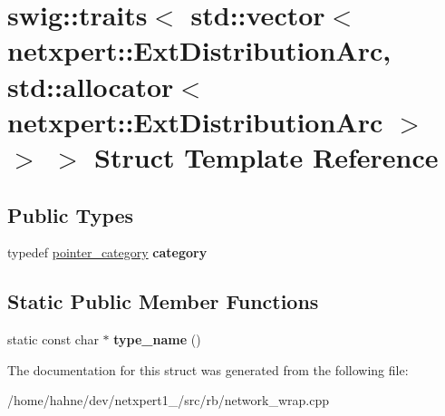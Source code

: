 \hypertarget{structswig_1_1traits_3_01std_1_1vector_3_01netxpert_1_1ExtDistributionArc_00_01std_1_1allocator_82a5b89f4c8a57263dc469d06e4cfb4f}{}\section{swig\+:\+:traits$<$ std\+:\+:vector$<$ netxpert\+:\+:Ext\+Distribution\+Arc, std\+:\+:allocator$<$ netxpert\+:\+:Ext\+Distribution\+Arc $>$ $>$ $>$ Struct Template Reference}
\label{structswig_1_1traits_3_01std_1_1vector_3_01netxpert_1_1ExtDistributionArc_00_01std_1_1allocator_82a5b89f4c8a57263dc469d06e4cfb4f}
\subsection*{Public Types}
\begin{DoxyCompactItemize}
\item 
typedef \hyperlink{structswig_1_1pointer__category}{pointer\+\_\+category} {\bfseries category}\hypertarget{structswig_1_1traits_3_01std_1_1vector_3_01netxpert_1_1ExtDistributionArc_00_01std_1_1allocator_82a5b89f4c8a57263dc469d06e4cfb4f_ab1c3b535511a386cf9cfea599fe7b456}{}\label{structswig_1_1traits_3_01std_1_1vector_3_01netxpert_1_1ExtDistributionArc_00_01std_1_1allocator_82a5b89f4c8a57263dc469d06e4cfb4f_ab1c3b535511a386cf9cfea599fe7b456}

\end{DoxyCompactItemize}
\subsection*{Static Public Member Functions}
\begin{DoxyCompactItemize}
\item 
static const char $\ast$ {\bfseries type\+\_\+name} ()\hypertarget{structswig_1_1traits_3_01std_1_1vector_3_01netxpert_1_1ExtDistributionArc_00_01std_1_1allocator_82a5b89f4c8a57263dc469d06e4cfb4f_a9b86de803a18fb87970d9fa56bb4451a}{}\label{structswig_1_1traits_3_01std_1_1vector_3_01netxpert_1_1ExtDistributionArc_00_01std_1_1allocator_82a5b89f4c8a57263dc469d06e4cfb4f_a9b86de803a18fb87970d9fa56bb4451a}

\end{DoxyCompactItemize}


The documentation for this struct was generated from the following file\+:\begin{DoxyCompactItemize}
\item 
/home/hahne/dev/netxpert1\+\_/src/rb/network\+\_\+wrap.\+cpp\end{DoxyCompactItemize}
